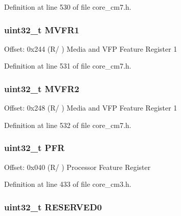Definition at line 530 of file core\+\_\+cm7.\+h.

\subsubsection[{\texorpdfstring{M\+V\+F\+R1}{MVFR1}}]{ uint32\+\_\+t M\+V\+F\+R1}\hypertarget{struct_s_c_b___type_a0a610dc4212de3ce1ad62e9afa76c728}{}\label{struct_s_c_b___type_a0a610dc4212de3ce1ad62e9afa76c728}
Offset\+: 0x244 (R/ ) Media and V\+FP Feature Register 1 

Definition at line 531 of file core\+\_\+cm7.\+h.

\subsubsection[{\texorpdfstring{M\+V\+F\+R2}{MVFR2}}]{ uint32\+\_\+t M\+V\+F\+R2}\hypertarget{struct_s_c_b___type_a8353348c9336aa1aadcbf86b6f0f18c9}{}\label{struct_s_c_b___type_a8353348c9336aa1aadcbf86b6f0f18c9}
Offset\+: 0x248 (R/ ) Media and V\+FP Feature Register 1 

Definition at line 532 of file core\+\_\+cm7.\+h.

\subsubsection[{\texorpdfstring{P\+FR}{PFR}}]{ uint32\+\_\+t P\+FR}\hypertarget{struct_s_c_b___type_a1ecf64bb2faf3ee512e4b40a290e4d71}{}\label{struct_s_c_b___type_a1ecf64bb2faf3ee512e4b40a290e4d71}
Offset\+: 0x040 (R/ ) Processor Feature Register 

Definition at line 433 of file core\+\_\+cm3.\+h.

\subsubsection[{\texorpdfstring{R\+E\+S\+E\+R\+V\+E\+D0}{RESERVED0}}]{\setlength{\rightskip}{0pt plus 5cm}uint32\+\_\+t R\+E\+S\+E\+R\+V\+E\+D0}\hypertarget{struct_s_c_b___type_af86c61a5d38a4fc9cef942a12744486b}{}\label{struct_s_c_b___type_af86c61a5d38a4fc9cef942a12744486b}


